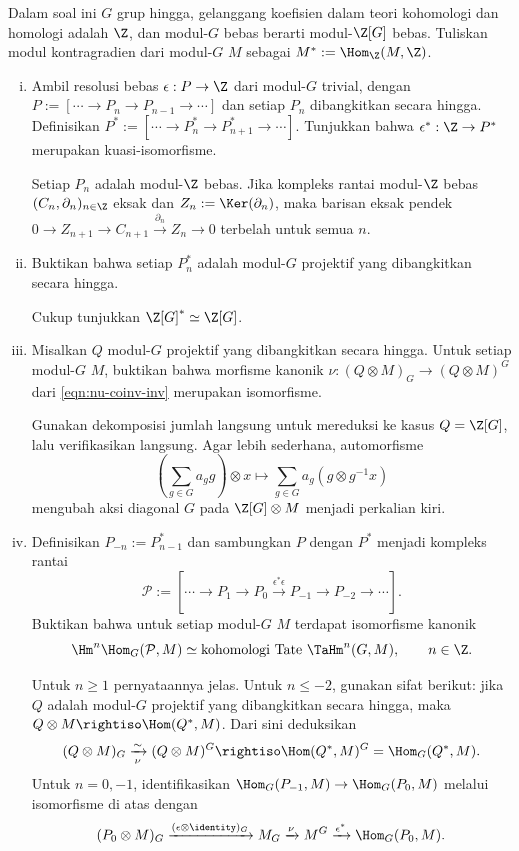 \begin{Exercises}
	\item Dalam soal ini $G$ grup hingga, gelanggang koefisien dalam teori
	kohomologi dan homologi adalah $\Z$, dan modul-$G$ bebas berarti
	modul-$\Z[G]$ bebas. Tuliskan modul kontragradien dari modul-$G$ $M$ sebagai
	$M^*:=\Hom_{\Z}(M,\Z)$.
	\begin{enumerate}[(i)]
		\item Ambil resolusi bebas $\epsilon:P\to\Z$ dari modul-$G$ trivial,
		dengan $P:=[\cdots\to P_n\to P_{n-1}\to\cdots]$ dan setiap $P_n$
		dibangkitkan secara hingga. Definisikan
		$P^*:=[\cdots\to P_n^*\to P_{n+1}^*\to\cdots]$. Tunjukkan bahwa
		$\epsilon^*:\Z\to P^*$ merupakan kuasi-isomorfisme.
		\begin{hint}
			Setiap $P_n$ adalah modul-$\Z$ bebas. Jika kompleks rantai modul-$\Z$
			bebas $(C_n,\partial_n)_{n\in\Z}$ eksak dan
			$Z_n:=\Ker(\partial_n)$, maka barisan eksak pendek
			$0\to Z_{n+1}\to C_{n+1}\xrightarrow{\partial_n}Z_n\to0$
			terbelah untuk semua $n$.
		\end{hint}
		\item Buktikan bahwa setiap $P_n^*$ adalah modul-$G$ projektif yang
		dibangkitkan secara hingga.
		\begin{hint}
			Cukup tunjukkan $\Z[G]^*\simeq\Z[G]$.
		\end{hint}
		\item Misalkan $Q$ modul-$G$ projektif yang dibangkitkan secara hingga.
		Untuk setiap modul-$G$ $M$, buktikan bahwa morfisme kanonik
		$\nu:(Q\otimes M)_G\to(Q\otimes M)^G$ dari
		\eqref{eqn:nu-coinv-inv} merupakan isomorfisme.
		\begin{hint}
			Gunakan dekomposisi jumlah langsung untuk mereduksi ke kasus
			$Q=\Z[G]$, lalu verifikasikan langsung. Agar lebih sederhana,
			automorfisme
			\[ \left(\sum_{g\in G}a_gg\right)\otimes x
			\mapsto\sum_{g\in G}a_g(g\otimes g^{-1}x) \]
			mengubah aksi diagonal $G$ pada $\Z[G]\otimes M$ menjadi perkalian
			kiri.
		\end{hint}

		\item Definisikan $P_{-n}:=P^*_{n-1}$ dan sambungkan $P$ dengan $P^*$
		menjadi kompleks rantai
		\[ \mathcal{P}:=[\cdots\to P_1\to P_0
		\xrightarrow{\epsilon^*\epsilon}P_{-1}\to P_{-2}\to\cdots]. \]
		Buktikan bahwa untuk setiap modul-$G$ $M$ terdapat isomorfisme kanonik
		\[ \Hm^n\Hom_G(\mathcal{P},M)
		\simeq\text{kohomologi Tate }\TaHm^n(G,M),\qquad n\in\Z. \]

		\begin{hint}
			Untuk $n\geq1$ pernyataannya jelas. Untuk $n\leq-2$, gunakan sifat
			berikut: jika $Q$ adalah modul-$G$ projektif yang dibangkitkan secara
			hingga, maka $Q\otimes M\rightiso\Hom(Q^*,M)$. Dari sini deduksikan
			\[ (Q\otimes M)_G\xrightarrow[\nu]{\sim}(Q\otimes M)^G
			\rightiso\Hom(Q^*,M)^G=\Hom_G(Q^*,M). \]
			Untuk $n=0,-1$, identifikasikan
			$\Hom_G(P_{-1},M)\to\Hom_G(P_0,M)$ melalui isomorfisme di atas dengan
			\[ (P_0\otimes M)_G\xrightarrow{(\epsilon\otimes\identity)_G}M_G
			\xrightarrow{\nu}M^G\xrightarrow{\epsilon^*}\Hom_G(P_0,M). \]
		\end{hint}


\end{enumerate}
\end{Exercises}
